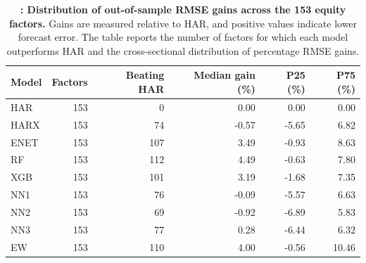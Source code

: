 \begin{table}[htbp]
\centering\footnotesize
\captionsetup{justification=raggedright,labelsep=none,singlelinecheck=false,labelformat=boldlabel}
\renewcommand{\arraystretch}{1.15}
\setlength{\tabcolsep}{4pt}
\caption[Distribution of out-of-sample RMSE gains across the 153 equity factors.]{\footnotesize \textbf{: Distribution of out-of-sample RMSE gains across the 153 equity factors.} Gains are measured relative to HAR, and positive values indicate lower forecast error. The table reports the number of factors for which each model outperforms HAR and the cross-sectional distribution of percentage RMSE gains.}\label{tab:rv-factor_gain_summary}
\begin{tabular}{lrrrrr}
\hline
Model & Factors & Beating HAR & Median gain (\%) & P25 (\%) & P75 (\%) \\
\hline
HAR & 153 & 0 & 0.00 & 0.00 & 0.00 \\
HARX & 153 & 74 & -0.57 & -5.65 & 6.82 \\
ENET & 153 & 107 & 3.49 & -0.93 & 8.63 \\
RF & 153 & 112 & 4.49 & -0.63 & 7.80 \\
XGB & 153 & 101 & 3.19 & -1.68 & 7.35 \\
NN1 & 153 & 76 & -0.09 & -5.57 & 6.63 \\
NN2 & 153 & 69 & -0.92 & -6.89 & 5.83 \\
NN3 & 153 & 77 & 0.28 & -6.44 & 6.32 \\
EW & 153 & 110 & 4.00 & -0.56 & 10.46 \\
\hline
\end{tabular}
\end{table}
